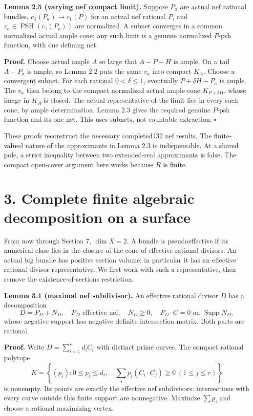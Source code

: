 \documentclass[
  10pt,
]{article}
\begin{document}
\textbf{Lemma 2.5 (varying nef compact limit).} Suppose \(P_a\) are
actual nef rational bundles, \(c_1(P_a)\to c_1(P)\) for an actual nef
rational \(P\), and \(v_a\in\operatorname{PSH}(c_1(P_a))\) are
normalized. A subnet converges in a common normalized actual ample cone;
any such limit is a genuine normalized \(P\)-psh function, with one
defining net.

\textbf{Proof.} Choose actual ample \(A\) so large that \(A-P-H\) is
ample. On a tail \(A-P_a\) is ample, so Lemma 2.2 puts the same \(v_a\)
into compact \(K_A\). Choose a convergent subnet. For each rational
\(0<\delta\leq1\), eventually \(P+\delta H-P_a\) is ample. The \(v_a\)
then belong to the compact normalized actual ample cone
\(K_{P+\delta H}\), whose image in \(K_A\) is closed. The actual
representative of the limit lies in every such cone, by ample
determination. Lemma 2.3 gives the required genuine \(P\)-psh function
and its one net. This uses subnets, not countable extraction.
\(\square\)

These proofs reconstruct the necessary completed132 nef results. The
finite-valued nature of the approximants in Lemma 2.3 is indispensable.
At a shared pole, a strict inequality between two extended-real
approximants is false. The compact open-cover argument here works
because \(R\) is finite.

\section{3. Complete finite algebraic decomposition on a
surface}\label{complete-finite-algebraic-decomposition-on-a-surface}

From now through Section 7, \(\dim X=2\). A bundle is pseudoeffective if
its numerical class lies in the closure of the cone of effective
rational divisors. An actual big bundle has positive section volume; in
particular it has an effective rational divisor representative. We first
work with such a representative, then remove the existence-of-sections
restriction.

\textbf{Lemma 3.1 (maximal nef subdivisor).} An effective rational
divisor \(D\) has a decomposition \[
 D=P_D+N_D,
 \quad P_D\text{ effective nef},\quad N_D\geq0,\quad
 P_D\cdot C=0\text{ on }\operatorname{Supp}N_D,
                                                               \tag{3.1}
\] whose negative support has negative definite intersection matrix.
Both parts are rational.

\textbf{Proof.} Write \(D=\sum_{i=1}^r d_iC_i\) with distinct prime
curves. The compact rational polytope \[
 K=\left\{(p_i):0\leq p_i\leq d_i,\quad
                  \sum_i p_i(C_i\cdot C_j)\geq0\ (1\leq j\leq r)
      \right\}                                                \tag{3.2}
\] is nonempty. Its points are exactly the effective nef subdivisors:
intersections with every curve outside this finite support are
nonnegative. Maximize \(\sum p_i\) and choose a rational maximizing
vertex.
\end{document}
